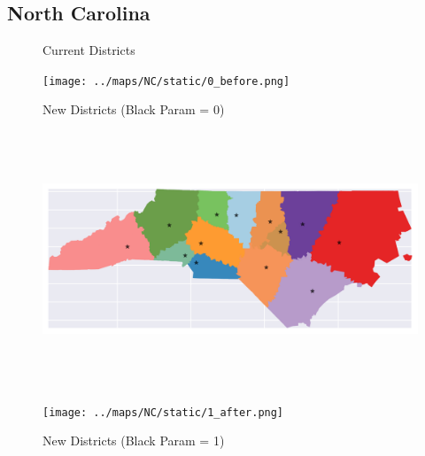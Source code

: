 \subsection{North Carolina}
\begin{figure}[htb!] \centering
\caption{ Current Districts }
\texttt{[image: ../maps/NC/static/0\_before.png]}
\caption{ New Districts (Black Param = 0) }
\includegraphics[width=5in,height=3in,keepaspectratio]{../maps/NC/static/0_after.png}
\caption{ New Districts (Black Param = 1) }
\texttt{[image: ../maps/NC/static/1\_after.png]}
\end{figure}

\clearpage
\newpage


